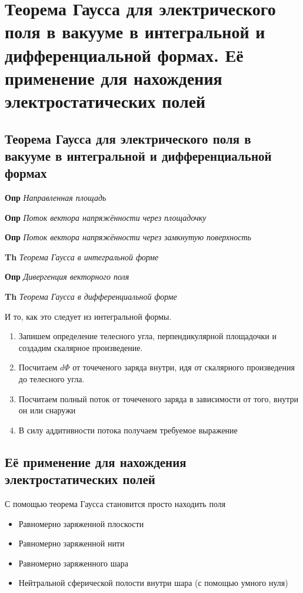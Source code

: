 \documentclass[a4paper, 14pt]{article}
\begin{document}
    \section{Теорема Гаусса для электрического поля в вакууме в интегральной и дифференциальной формах.
    Её применение для нахождения электростатических полей}
    
    \subsection{Теорема Гаусса для электрического поля в вакууме в интегральной и дифференциальной формах}
    
    \textbf{Опр} \textit{Направленная площадь}
    
    \textbf{Опр} \textit{Поток вектора напряжённости через площадочку}
    
    \textbf{Опр} \textit{Поток вектора напряжённости через замкнутую поверхность}
    
    \textbf{Th} \textit{Теорема Гаусса в интегральной форме}
    
    \textbf{Опр} \textit{Дивергенция векторного поля}
    
    \textbf{Th} \textit{Теорема Гаусса в дифференциальной форме}
    
    И то, как это следует из интегральной формы.
    
    \begin{enumerate}
        \item Запишем определение телесного угла, перпендикулярной площадочки и создадим скалярное произведение.
        \item Посчитаем $d \Phi$ от точеченого заряда внутри, идя от скалярного произведения до телесного угла.
        \item Посчитаем полный поток от точеченого заряда в зависимости от того, внутри он или снаружи
        \item В силу аддитивности потока получаем требуемое выражение
    \end{enumerate}
    
    \subsection{Её применение для нахождения электростатических полей}
    
    С помощью теорема Гаусса становится просто находить поля
    
    \begin{itemize}
        \item Равномерно заряженной плоскости
        \item Равномерно заряженной нити
        \item Равномерно заряженного шара
        \item Нейтральной сферической полости внутри шара (с помощью умного нуля)
    \end{itemize}
    
\end{document}
